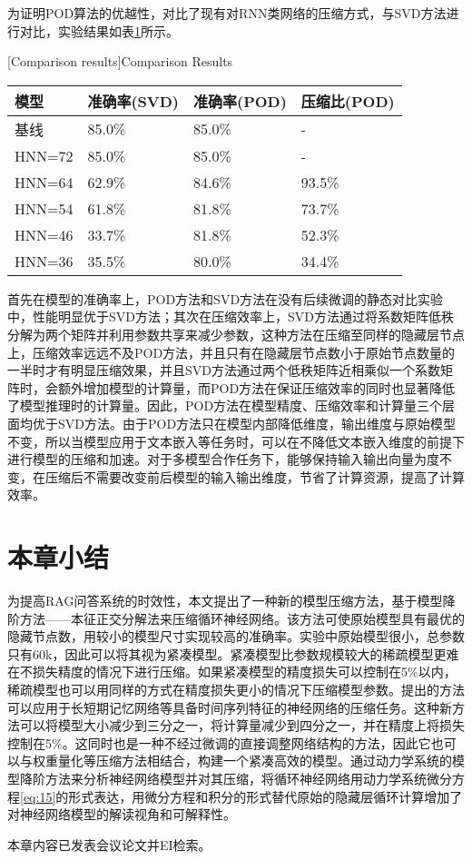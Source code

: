 为证明POD算法的优越性，对比了现有对RNN类网络的压缩方式，与SVD\cite{xue2013restructuring}方法进行对比，实验结果如表\ref{tab:method-comparison}所示。
\begin{table}[htb]
  \centering
  \begin{minipage}[t]{0.8\linewidth}
    [Comparison results]{Comparison Results}
    \label{tab:method-comparison}
    \begin{tabularx}{\linewidth}{lXXX}
      \toprule[1.5pt]
      {模型} & {准确率(SVD)} & {准确率(POD)} & {压缩比(POD)} \\\midrule[1pt]
      基线 & 85.0\% & 85.0\% & - \\
      HNN=72 & 85.0\% & 85.0\% & - \\
      HNN=64 & 62.9\% & 84.6\% & 93.5\% \\
      HNN=54 & 61.8\% & 81.8\% & 73.7\% \\
      HNN=46 & 33.7\% & 81.8\% & 52.3\% \\
      HNN=36 & 35.5\% & 80.0\% & 34.4\% \\
      \bottomrule[1.5pt]
    \end{tabularx}
  \end{minipage}
\end{table}

首先在模型的准确率上，POD方法和SVD方法在没有后续微调的静态对比实验中，性能明显优于SVD方法；其次在压缩效率上，SVD方法通过将系数矩阵低秩分解为两个矩阵并利用参数共享来减少参数，这种方法在压缩至同样的隐藏层节点上，压缩效率远远不及POD方法，并且只有在隐藏层节点数小于原始节点数量的一半时才有明显压缩效果，并且SVD方法通过两个低秩矩阵近相乘似一个系数矩阵时，会额外增加模型的计算量，而POD方法在保证压缩效率的同时也显著降低了模型推理时的计算量。因此，POD方法在模型精度、压缩效率和计算量三个层面均优于SVD方法。由于POD方法只在模型内部降低维度，输出维度与原始模型不变，所以当模型应用于文本嵌入等任务时，可以在不降低文本嵌入维度的前提下进行模型的压缩和加速。对于多模型合作任务下，能够保持输入输出向量为度不变，在压缩后不需要改变前后模型的输入输出维度，节省了计算资源，提高了计算效率。
\section{本章小结}
为提高RAG问答系统的时效性，本文提出了一种新的模型压缩方法，基于模型降阶方法——本征正交分解法来压缩循环神经网络。该方法可使原始模型具有最优的隐藏节点数，用较小的模型尺寸实现较高的准确率。实验中原始模型很小，总参数只有60k，因此可以将其视为紧凑模型。紧凑模型比参数规模较大的稀疏模型更难在不损失精度的情况下进行压缩。如果紧凑模型的精度损失可以控制在5\%以内，稀疏模型也可以用同样的方式在精度损失更小的情况下压缩模型参数。提出的方法可以应用于长短期记忆网络等具备时间序列特征的神经网络的压缩任务。这种新方法可以将模型大小减少到三分之一，将计算量减少到四分之一，并在精度上将损失控制在5\%。这同时也是一种不经过微调的直接调整网络结构的方法，因此它也可以与权重量化等压缩方法相结合，构建一个紧凑高效的模型。通过动力学系统的模型降阶方法来分析神经网络模型并对其压缩，将循环神经网络用动力学系统微分方程\ref{eq:15}的形式表达，用微分方程和积分的形式替代原始的隐藏层循环计算增加了对神经网络模型的解读视角和可解释性。

本章内容已发表会议论文并EI检索。
